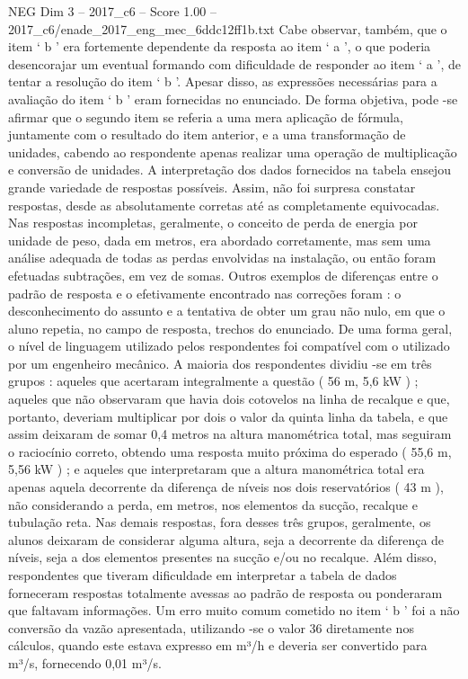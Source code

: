 \begin{textsample}{NEG Dim 3 – 2017\_c6 – Score 1.00 – 2017\_c6/enade\_2017\_eng\_mec\_6ddc12ff1b.txt}
Cabe observar, também, que o item ‘ b ’ era fortemente dependente da resposta ao item ‘ a ’, o que poderia desencorajar um eventual formando com dificuldade de responder ao item ‘ a ’, de tentar a resolução do item ‘ b ’.
Apesar disso, as expressões necessárias para a avaliação do item ‘ b ’ eram fornecidas no enunciado.
De forma objetiva, pode -se afirmar que o segundo item se referia a uma mera aplicação de fórmula, juntamente com o resultado do item anterior, e a uma transformação de unidades, cabendo ao respondente apenas realizar uma operação de multiplicação e conversão de unidades.
A interpretação dos dados fornecidos na tabela ensejou grande variedade de respostas possíveis.
Assim, não foi surpresa constatar respostas, desde as absolutamente corretas até as completamente equivocadas.
Nas respostas incompletas, geralmente, o conceito de perda de energia por unidade de peso, dada em metros, era abordado corretamente, mas sem uma análise adequada de todas as perdas envolvidas na instalação, ou então foram efetuadas subtrações, em vez de somas.
Outros exemplos de diferenças entre o padrão de resposta e o efetivamente encontrado nas correções foram : o desconhecimento do assunto e a tentativa de obter um grau não nulo, em que o aluno repetia, no campo de resposta, trechos do enunciado.
De uma forma geral, o nível de linguagem utilizado pelos respondentes foi compatível com o utilizado por um engenheiro mecânico.
A maioria dos respondentes dividiu -se em três grupos : aqueles que acertaram integralmente a questão ( 56 m, 5,6 kW ) ; aqueles que não observaram que havia dois cotovelos na linha de recalque e que, portanto, deveriam multiplicar por dois o valor da quinta linha da tabela, e que assim deixaram de somar 0,4 metros na altura manométrica total, mas seguiram o raciocínio correto, obtendo uma resposta muito próxima do esperado ( 55,6 m, 5,56 kW ) ; e aqueles que interpretaram que a altura manométrica total era apenas aquela decorrente da diferença de níveis nos dois reservatórios ( 43 m ), não considerando a perda, em metros, nos elementos da sucção, recalque e tubulação reta.
Nas demais respostas, fora desses três grupos, geralmente, os alunos deixaram de considerar alguma altura, seja a decorrente da diferença de níveis, seja a dos elementos presentes na sucção e/ou no recalque.
Além disso, respondentes que tiveram dificuldade em interpretar a tabela de dados forneceram respostas totalmente avessas ao padrão de resposta ou ponderaram que faltavam informações.
Um erro muito comum cometido no item ‘ b ’ foi a não conversão da vazão apresentada, utilizando -se o valor 36 diretamente nos cálculos, quando este estava expresso em m³/h e deveria ser convertido para m³/s, fornecendo 0,01 m³/s.

\end{textsample}
